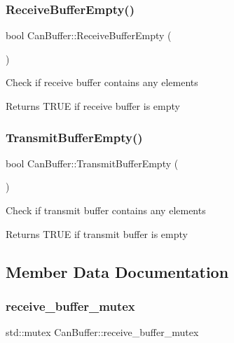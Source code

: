 \subsubsection{\texorpdfstring{Receive\+Buffer\+Empty()}{ReceiveBufferEmpty()}}
{\footnotesize\ttfamily bool Can\+Buffer\+::\+Receive\+Buffer\+Empty (\begin{DoxyParamCaption}{ }\end{DoxyParamCaption})}

Check if receive buffer contains any elements \begin{DoxyReturn}{Returns}
T\+R\+UE if receive buffer is empty 
\end{DoxyReturn}
\mbox{\label{classCanBuffer_a3826a986a95c4eb24f363a7ace01bec2}} 
\subsubsection{\texorpdfstring{Transmit\+Buffer\+Empty()}{TransmitBufferEmpty()}}
{\footnotesize\ttfamily bool Can\+Buffer\+::\+Transmit\+Buffer\+Empty (\begin{DoxyParamCaption}{ }\end{DoxyParamCaption})}

Check if transmit buffer contains any elements \begin{DoxyReturn}{Returns}
T\+R\+UE if transmit buffer is empty 
\end{DoxyReturn}


\subsection{Member Data Documentation}
\mbox{\label{classCanBuffer_a99e2db7eb22a8f25ca92d5c5e791e99f}} 
\subsubsection{\texorpdfstring{receive\+\_\+buffer\+\_\+mutex}{receive\_buffer\_mutex}}
{\footnotesize\ttfamily std\+::mutex Can\+Buffer\+::receive\+\_\+buffer\+\_\+mutex\hspace{0.3cm}{\ttfamily [private]}}

